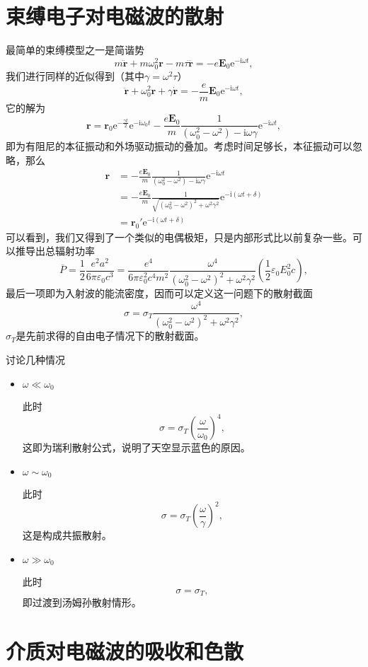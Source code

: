 \documentclass[UTF8]{ctexbook}
\newcommand{\e}{\mathrm{e}}
\renewcommand{\b}{\boldsymbol}
\renewcommand{\i}{\mathrm{i}}
\numberwithin{equation}{chapter}
\begin{document}
	\section{束缚电子对电磁波的散射}
	
	最简单的束缚模型之一是简谐势
	\[m\ddot{\b{r}}+m\omega_0^2\b{r}-m\tau\dddot{\b{r}}=-e\b{E}_0\e^{-\i\omega t},\]
	我们进行同样的近似得到（其中$\gamma=\omega^2\tau$）
	\[\ddot{\b{r}}+\omega^2_0\b{r}+\gamma\dot{\b{r}}=-\frac{e}{m}\b{E}_0\e^{-\i\omega t},\]
	它的解为
	\[\b{r}=\b{r}_0\e^{-\frac{\gamma t}{2}}\e^{-\i\omega_0 t}-\frac{e\b{E}_0}{m}\frac{1}{(\omega_0^2-\omega^2)-\i\omega\gamma}\e^{-\i\omega t},\]
	即为有阻尼的本征振动和外场驱动振动的叠加。考虑时间足够长，本征振动可以忽略，那么
	\begin{align*}
		\b{r}&=-\frac{e\b{E}_0}{m}\frac{1}{(\omega_0^2-\omega^2)-\i\omega\gamma}\e^{-\i\omega t}\\
		&=-\frac{e\b{E}_0}{m}\frac{1}{\sqrt{(\omega_0^2-\omega^2)^2+\omega^2\gamma^2}}\e^{-\i(\omega t+\delta)}\\
		&=\b{r}_0'\e^{-\i(\omega t+\delta)}
	\end{align*}
	可以看到，我们又得到了一个类似的电偶极矩，只是内部形式比以前复杂一些。可以推导出总辐射功率
	\[\overline{P}=\frac{1}{2}\frac{e^2a^2}{6\pi\varepsilon_0c^3}=\frac{e^4}{6\pi\varepsilon_0^2c^4m^2}\frac{\omega^4}{(\omega_0^2-\omega^2)^2+\omega^2\gamma^2}\left(\frac{1}{2}\varepsilon_0E_0^2c\right),\]
	最后一项即为入射波的能流密度，因而可以定义这一问题下的散射截面
	\[\sigma=\sigma_T\frac{\omega^4}{(\omega_0^2-\omega^2)^2+\omega^2\gamma^2},\]
	$\sigma_T$是先前求得的自由电子情况下的散射截面。
	
	讨论几种情况
	\begin{itemize}
		\item $\omega\ll \omega_0$
			
			此时
			\[\sigma=\sigma_T\left(\frac{\omega}{\omega_0}\right)^4,\]
			这即为瑞利散射公式，说明了天空显示蓝色的原因。
		\item $\omega \sim \omega_0$
		
			此时
			\[\sigma=\sigma_T\left(\frac{\omega}{\gamma}\right)^2,\]
			这是构成共振散射。
			
		\item $\omega\gg \omega_0$
		
		此时
		\[\sigma=\sigma_T,\]
		即过渡到汤姆孙散射情形。
	\end{itemize}
	
	\section{介质对电磁波的吸收和色散}
	
\end{document}
